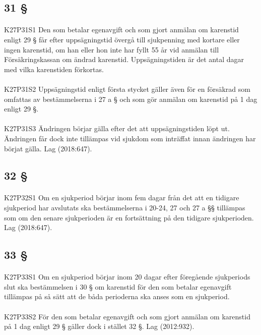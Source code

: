 \documentclass[a4paper,notitlepage,openany,10pt]{book}
\begin{document}
\subsection*{31 §}
\paragraph*{}
{\tiny K27P31S1}
Den som betalar egenavgift och som gjort anmälan om karenstid enligt 29 § får efter uppsägningstid övergå till sjukpenning med kortare eller ingen karenstid, om han eller hon inte har fyllt 55 år vid anmälan till Försäkringskassan om ändrad karenstid. Uppsägningstiden är det antal dagar med vilka karenstiden förkortas.
\paragraph*{}
{\tiny K27P31S2}
Uppsägningstid enligt första stycket gäller även för en försäkrad som omfattas av bestämmelserna i 27 a § och som gör anmälan om karenstid på 1 dag enligt 29 §.
\paragraph*{}
{\tiny K27P31S3}
Ändringen börjar gälla efter det att uppsägningstiden löpt ut. Ändringen får dock inte tillämpas vid sjukdom som inträffat innan ändringen har börjat gälla.
Lag (2018:647).
\subsection*{32 §}
\paragraph*{}
{\tiny K27P32S1}
Om en sjukperiod börjar inom fem dagar från det att en tidigare sjukperiod har avslutats ska bestämmelserna i 20-24, 27 och 27 a §§ tillämpas som om den senare sjukperioden är en fortsättning på den tidigare sjukperioden.
Lag (2018:647).
\subsection*{33 §}
\paragraph*{}
{\tiny K27P33S1}
Om en sjukperiod börjar inom 20 dagar efter föregående sjukperiods slut ska bestämmelsen i 30 § om karenstid för den som betalar egenavgift tillämpas på så sätt att de båda perioderna ska anses som en sjukperiod.
\paragraph*{}
{\tiny K27P33S2}
För den som betalar egenavgift och som gjort anmälan om karenstid på 1 dag enligt 29 § gäller dock i stället 32 §.
Lag (2012:932).
\end{document}
